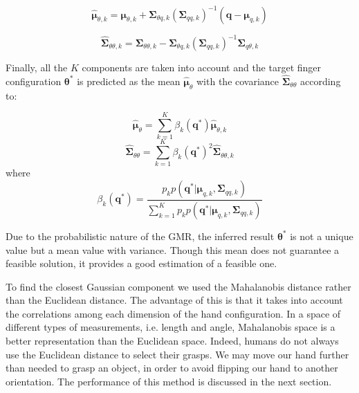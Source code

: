 \begin{equation}
{
\hat{\boldsymbol{\mu}}_{\theta,k} = \boldsymbol{\mu}_{\theta,k} + \boldsymbol{\Sigma}_{\theta{q},k}(\boldsymbol{\Sigma}_{qq,k})^{-1}(\boldsymbol{q}-\boldsymbol{\mu}_{q,k})
}
\end{equation}

\begin{equation}
{
\hat{\boldsymbol{\Sigma}}_{\theta\theta,k} = \boldsymbol{\Sigma}_{\theta\theta,k} - \boldsymbol{\Sigma}_{\theta{q},k}(\boldsymbol{\Sigma}_{qq,k})^{-1}\boldsymbol{\Sigma}_{{q}\theta,k}
}
\end{equation}


Finally, all the $K$ components are taken into account and the target finger configuration $\boldsymbol{\theta}^*$ is predicted as the mean $\hat{\boldsymbol{\mu}}_\theta$ with the covariance $\hat{\boldsymbol{\Sigma}}_{\theta\theta}$ according to:

\begin{equation}
{
\hat{\boldsymbol{\mu}}_{\theta} = \sum_{k=1}^K{\beta_k(\boldsymbol{q}^*)}\hat{\boldsymbol{\mu}}_{\theta,k}
}
\end{equation}
\begin{equation}
{
\hat{\boldsymbol{\Sigma}}_{\theta\theta} = \sum_{k=1}^K{\beta_k(\boldsymbol{q}^*)}^2\hat{\boldsymbol{\Sigma}}_{\theta\theta,k}
}
\end{equation}
where
\begin{equation}
{
\beta_k(\boldsymbol{q}^*) = \frac{p_{k}p(\boldsymbol{q}^*|\boldsymbol{\mu}_{q,k},\boldsymbol{\Sigma}_{qq,k})}{\sum_{k=1}^K{p_k}p(\boldsymbol{q}^*|\boldsymbol{\mu}_{q,k},\boldsymbol{\Sigma}_{qq,k})}
}
\end{equation}

Due to the probabilistic nature of the GMR, the inferred result $\boldsymbol{\theta}^*$ is not a unique value but a mean value with variance. Though this mean does not guarantee a feasible solution, it provides a good estimation of a feasible one.

To find the closest Gaussian component we used the Mahalanobis distance rather than the Euclidean distance. The advantage of this is that it takes into account the correlations among each dimension of the hand configuration. In a space of different types of measurements, i.e. length and angle, Mahalanobis space is a better representation than the Euclidean space. Indeed, humans do not always use the Euclidean distance to select their grasps. We may move our hand further than needed to grasp an object, in order to avoid flipping our hand to another orientation. The performance of this method is discussed in the next section.

